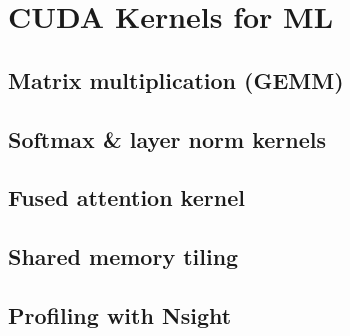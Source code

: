 
\section{CUDA Kernels for ML}

\subsection{Matrix multiplication (GEMM)}


\subsection{Softmax \& layer norm kernels}


\subsection{Fused attention kernel}


\subsection{Shared memory tiling}


\subsection{Profiling with Nsight}


